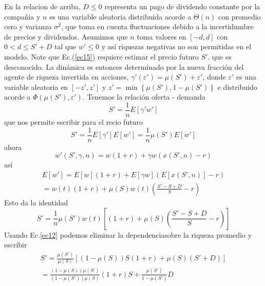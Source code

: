 \documentclass[12pt,a4paper]{article}
\begin{document}
En la relacion de arriba, $D\leq 0$ representa un pago de dividendo constante por la compañia y $n$ es una variable aleatoria distribuida acorde a $\Theta(n)$ con promedio cero y varianza $\sigma^2$, que toma en cuenta fluctuaciones debido a la incertidumbre de precios y dividendos. Asumimos que $n$ toma valores en $[-d,d]$ con $0<d\leq S'+D $ tal que $w'\leq 0$ y así riquezas negativas no son permitidas en el modelo. Note que Ec.(\ref{ec15}) requiere estimar el precio futuro $S'$. que es desconocido.
La dinámica es entonces determinado por la nueva fracción del agente de riqueza invertida en acciones, $\gamma'(\varepsilon')=\mu(S')+\varepsilon'$, donde $\varepsilon'$ es una variable aleatoria en $[-z',z']$ y 
$z'= \min \left\{ \mu(S'),1-\mu(S')\right\}$ e distribuido acorde a $\Phi(\mu(S'),\varepsilon')$. Tenemos la relación oferta - demanda
\begin{equation}
S'=\frac{1}{n}E[\gamma'w']
\end{equation}
que nos permite escribir para el recio futuro
\begin{equation}
S'= \frac{1}{n} E[\gamma']E[w']= \frac{1}{n}\mu(S')E[w']\label{ec17}
\end{equation}
ahora
\begin{equation}
w'(S',\gamma,n)= w(1+r) + \gamma w (x(S',n)-r)
\end{equation}
así
\begin{eqnarray}
E[w']= E[w](1+r)+E[\gamma w](E[x(S',n)]-r) \\
=w(t)(1+r)+\mu (S)w(t)\left(\frac{ S'-S+D}{S}-r\right)
\end{eqnarray}
Esto da la identidad
\begin{equation}
S'=\frac{1}{n} \mu (S')w(t)\left[(1+r)+\mu(S)\left(\frac{S'-S+D}{S}-r\right) \right]
\end{equation}
Usando Ec.\ref{ec12} podemos eliminar la dependenciasobre la riqueza promedio y escribir
\begin{eqnarray}
S'=\frac{\mu(S')}{\mu(S)}\left[(1-\mu(S))S(1+r)+\mu(S)(S'+D) \right] \nonumber \\
= \frac{(1-\mu(S))\mu(S')}{(1-\mu(S'))\mu(S)}(1+r)S+\frac{\mu(S')}{1-\mu(S')}D\label{ec22}
\end{eqnarray}
\end{document}
